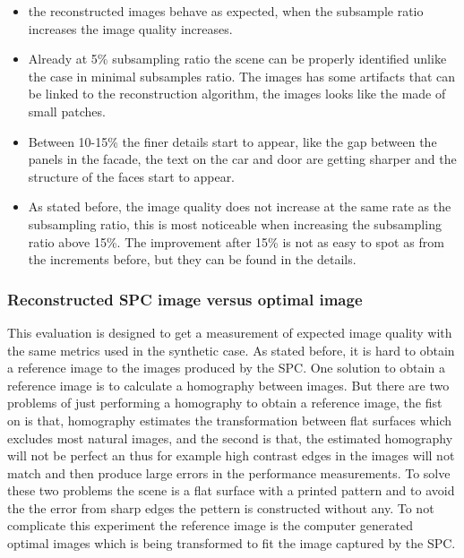 \begin{itemize}
\item the reconstructed images behave as expected, when the subsample ratio increases the image quality increases. 

\item Already at 5\% subsampling ratio the scene can be properly identified unlike the case in minimal subsamples ratio. The images has some artifacts that can be linked to the reconstruction algorithm, the images looks like the made of small patches.

\item Between 10-15\% the finer details start to appear, like the gap between the panels in the facade, the text on the car and door are getting sharper and the structure of the faces start to appear.

\item As stated before, the image quality does not increase at the same rate as the subsampling ratio, this is most noticeable when increasing the subsampling ratio above 15\%. The improvement after 15\% is not as easy to spot as from the increments before, but they can be found in the details. 
\end{itemize}



\subsubsection{Reconstructed SPC image versus optimal image}
This evaluation is designed to get a measurement of expected image quality with the same metrics used in the synthetic case. As stated before, it is hard to obtain a reference image to the images produced by the SPC. One solution to obtain a reference image is to calculate a homography between images. But there are two problems of just performing a homography to obtain a reference image, the fist on is that, homography estimates the transformation between flat surfaces which excludes most natural images, and the second is that, the estimated homography will not be perfect an thus for example high contrast edges in the images will not match and then produce large errors in the performance measurements. To solve these two problems the scene is a flat surface with a printed pattern and to avoid the the error from sharp edges the pettern is constructed without any. To not complicate this experiment the reference image is the computer generated optimal images which is being transformed to fit the image captured by the SPC.\\[0.1in] 

